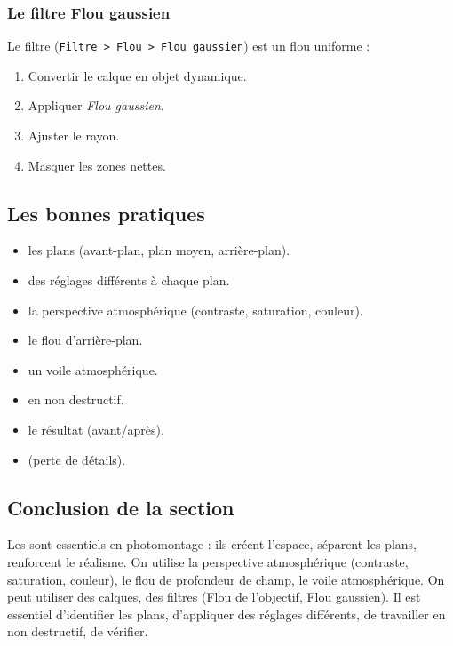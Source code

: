 \subsubsection{Le filtre Flou gaussien}

Le filtre  (\texttt{Filtre > Flou > Flou gaussien}) est un flou uniforme :

\begin{enumerate}
    \item Convertir le calque en objet dynamique.
    \item Appliquer \emph{Flou gaussien}.
    \item Ajuster le rayon.
    \item Masquer les zones nettes.
\end{enumerate}

\subsection{Les bonnes pratiques}

\begin{itemize}
    \item {} les plans (avant-plan, plan moyen, arrière-plan).
    \item {} des réglages différents à chaque plan.
    \item {} la perspective atmosphérique (contraste, saturation, couleur).
    \item {} le flou d'arrière-plan.
    \item {} un voile atmosphérique.
    \item {} en non destructif.
    \item {} le résultat (avant/après).
    \item {} (perte de détails).
\end{itemize}

\subsection*{Conclusion de la section}

Les  sont essentiels en photomontage : ils créent l'espace, séparent les plans, renforcent le réalisme. On utilise la perspective atmosphérique (contraste, saturation, couleur), le flou de profondeur de champ, le voile atmosphérique. On peut utiliser des calques, des filtres (Flou de l'objectif, Flou gaussien). Il est essentiel d'identifier les plans, d'appliquer des réglages différents, de travailler en non destructif, de vérifier.

